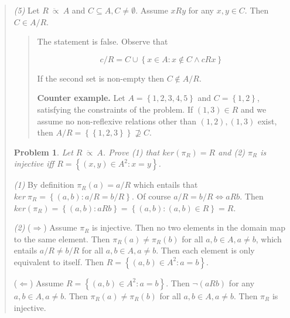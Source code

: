 \documentclass[a4paper, 12pt]{article}
\newtheorem{problem}{Problem}
\newtheorem{problem}{Problem}
\begin{document}
\begin{quote}
\textit{(5)} Let $R ~ \ddot{\propto} ~A$ and $C \subseteq A, C \neq \emptyset$.
Assume $xRy$ for any $x, y \in C$. Then $C \in A /R$.

\begin{quote}
    The statement is false. Observe that 

    $$c / R = C \cup \left\{ x \in A : x
    \not\in C \land  cRx \right\} $$

    If the second set is non-empty then $C \not\in A / R$.

    \textbf{Counter example.} Let $A = \left\{ 1, 2,3, 4, 5 \right\} $ and $C = \left\{
    1, 2 \right\} $, satisfying the constraints of the problem. If $(1, 3) \in
    R$ and we assume no non-reflexive relations other than $(1, 2), (1, 3)$ exist, then $A
    / R = \left\{ \left\{ 1, 2, 3 \right\}  \right\} \not\supseteq C$.


\end{quote}

\begin{problem}
    Let $R ~ \ddot{\propto} ~A$. Prove \textit{(1)} that $ker(\pi_R) = R$ and
    \textit{(2)} $\pi_R$ is injective iff $R = \left\{ (x, y) \in A^2 : x = y
    \right\} $.
\end{problem}

\textit{(1)} By definition $\pi_R(a) = a / R$ which entails that $ker ~ \pi_R =
\left\{ (a, b) : a/R = b / R \right\} $. Of course $a / R = b / R
\iff aRb$. Then $ker (\pi_R) = \left\{ (a, b) : aRb \right\} = \left\{ (a, b) :
(a, b) \in R\right\}  = R $.

\textit{(2)} ($\Rightarrow$) Assume $\pi_R$ is injective. Then no two elements in the domain map
to the same element. Then $\pi_R(a) \neq \pi_R(b)$ for all $a, b \in A, a \neq b$, which
entails $a / R \neq b / R$ for all $a, b \in  A, a \neq b$. Then each element is
only equivalent to itself. Then $R = \left\{ (a, b) \in A^2 : a = b \right\} $.

($\Leftarrow$) Assume $R = \left\{ (a, b) \in A^2 : a = b \right\} $. Then
$\neg(aRb)$ for any $a, b \in A, a \neq b$. Then $\pi_R(a) \neq \pi_R(b)$ for
all $a, b \in A, a \neq b$. Then $\pi_R$ is injective.

\end{quote}
\normalsize
\end{document}
